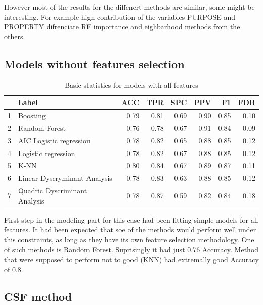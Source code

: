 \documentclass[10pt]{article}\usepackage[]{graphicx}\usepackage[]{color}
\begin{document}
However most of the results for the diffenert  methods are similar, some might be interesting. For example high contribution of the variables PURPOSE and PROPERTY difrenciate RF importance and eighbarhood methods from the others. 


\clearpage

\subsection{Models without features selection}




\begin{table}[ht]
\centering
\begin{tabular}{rlrrrrrr}
\hline
& Label & ACC & TPR & SPC & PPV & F1 & FDR \\ 
\hline
1 & Boosting & 0.79 & 0.81 & 0.69 & 0.90 & 0.85 & 0.10 \\ 
2 & Random Forest & 0.76 & 0.78 & 0.67 & 0.91 & 0.84 & 0.09 \\ 
3 & AIC Logistic regression & 0.78 & 0.82 & 0.65 & 0.88 & 0.85 & 0.12 \\ 
4 & Logistic regression & 0.78 & 0.82 & 0.67 & 0.88 & 0.85 & 0.12 \\ 
5 & K-NN & 0.80 & 0.84 & 0.67 & 0.89 & 0.87 & 0.11 \\ 
6 & Linear Dyscryminant Analysis & 0.78 & 0.83 & 0.63 & 0.88 & 0.85 & 0.12 \\ 
7 & Quadric Dyscriminant Analysis & 0.78 & 0.87 & 0.59 & 0.82 & 0.84 & 0.18 \\ 
\hline
\end{tabular}
\caption{Basic statistics for models with all features} 
\end{table}

First step in the modeling part for this case had been fitting simple models for all features. It had been expected that soe of the methods would perform well under this constraints, as long as they have its own feature selection methodology. One of such methods is Random Forest. Suprisingly it had just 0.76 Accuracy. Method that were supposed to perform not to good (KNN) had extremally good Accuracy of 0.8. 



\subsection{CSF method}
\end{document}
